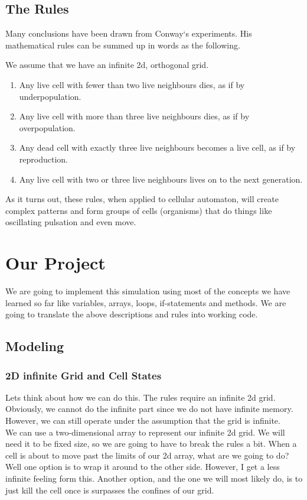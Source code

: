 \documentclass[11]{article}
\begin{document}
\subsection{The Rules}
Many conclusions have been drawn from Conway`s experiments. His mathematical rules can be summed up in words as the following.

We assume that we have an infinite 2d, orthogonal grid.

\begin{enumerate}
  \item Any live cell with fewer than two live neighbours dies, as if by underpopulation.
  \item Any live cell with more than three live neighbours dies, as if by overpopulation.
  \item Any dead cell with exactly three live neighbours becomes a live cell, as if by reproduction.
  \item Any live cell with two or three live neighbours lives on to the next generation.
\end{enumerate}

As it turns out, these rules, when applied to cellular automaton, will create complex patterns and form groups of cells (organisms) that do things like oscillating pulsation and even move.

\section{Our Project} 
We are going to implement this simulation using most of the concepts we have learned so far like variables, arrays, loops, if-statements and methods. We are going to translate the above descriptions and rules into working code.

\subsection{Modeling}
\subsubsection{2D infinite Grid and Cell States}
Lets think about how we can do this. The rules require an infinite 2d grid. Obviously, we cannot do the infinite part since we do not have infinite memory. However, we can still operate under the assumption that the grid is infinite.\\

We can use a two-dimensional array to represent our infinite 2d grid. We will need it to be fixed size, so we are going to have to break the rules a bit. When a cell is about to move past the limits of our 2d array, what are we going to do? Well one option is to wrap it around to the other side. However, I get a less infinite feeling form this. Another option, and the one we will most likely do, is to just kill the cell once is surpasses the confines of our grid.\\
\end{document}
